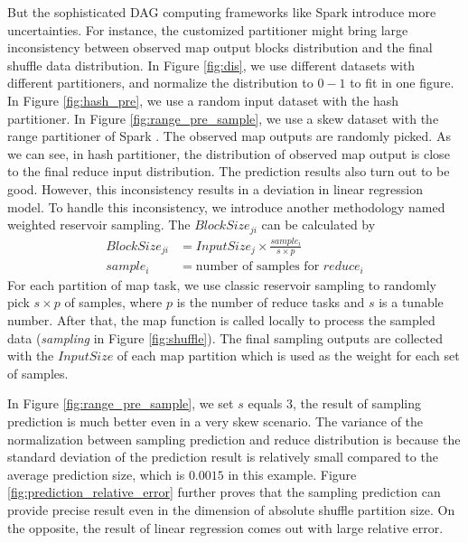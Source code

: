 But the sophisticated DAG computing frameworks like Spark introduce more uncertainties. For instance, the customized partitioner might bring large inconsistency between observed map output blocks distribution and the final shuffle data distribution. In Figure \ref{fig:dis}, we use different datasets with different partitioners, and normalize the distribution to $0-1$ to fit in one figure. In Figure \ref{fig:hash_pre}, we use a random input dataset with the hash partitioner. In Figure \ref{fig:range_pre_sample}, we use a skew dataset with the range partitioner of Spark \cite{apachespark}.
The observed map outputs are randomly picked. As we can see, in hash partitioner, the distribution of observed map output is close to the final reduce input distribution. The prediction results also turn out to be good. However, this inconsistency results in a deviation in linear regression model.
To handle this inconsistency, we introduce another methodology named weighted reservoir sampling. The $BlockSize_{ji}$ can be calculated by
\begin{equation}
\label{equationsample}
\begin{aligned}
	BlockSize_{ji} &= {{InputSize_j \times \frac{sample_i}{s \times p}}} \\
	sample_i &= \text{number of samples for $reduce_i$}
\end{aligned}
\end{equation}
For each partition of map task, we use classic reservoir sampling to randomly pick $s \times p$ of samples, where $p$ is the number of reduce tasks and $s$ is a tunable number. After that, the map function is called locally to process the sampled data (\textit{sampling} in Figure \ref{fig:shuffle}). The final sampling outputs are collected with the $InputSize$ of each map partition which is used as the weight for each set of samples.

In Figure \ref{fig:range_pre_sample}, we set $s$ equals $3$, the result of sampling prediction is much better even in a very skew scenario. The variance of the normalization between sampling prediction and reduce distribution is because the standard deviation of the prediction result is relatively small compared to the average prediction size, which is $0.0015$ in this example. Figure \ref{fig:prediction_relative_error} further proves that the sampling prediction can provide precise result even in the dimension of absolute shuffle partition size. On the opposite, the result of linear regression comes out with large relative error.

